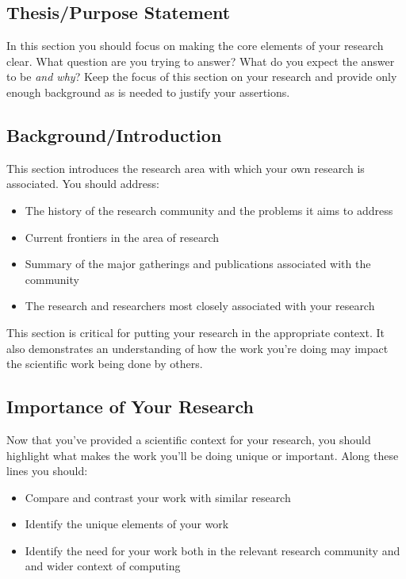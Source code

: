 \documentclass[10pt]{article}
\begin{document}
\subsection{Thesis/Purpose Statement}

In this section you should focus on making the core elements of your research clear.  What question are you trying to answer? What do you expect the answer to be \textit{and why}?  Keep the focus of this section on your research and provide only enough background as is needed to justify your assertions. 


\subsection{Background/Introduction}

This section introduces the research area with which your own research is associated.  You should address:
\begin{itemize}
\item The history of the research community and the problems it aims to address
\item Current frontiers in the area of research 
\item Summary of the major gatherings and publications associated with the community 
\item The research and researchers most closely associated with your research
\end{itemize}
This section is critical for putting your research in the appropriate context.  It also demonstrates an understanding of how the work you're doing may impact the scientific work being done by others.

\subsection{Importance of Your Research}

Now that you've provided a scientific context for your research, you should highlight what makes the work you'll be doing unique or important.  Along these lines you should:
\begin{itemize}
\item Compare and contrast your work with similar research
\item Identify the unique elements of your work
\item Identify the need for your work both in the relevant research community and and wider context of computing
\end{itemize}
\end{document}
